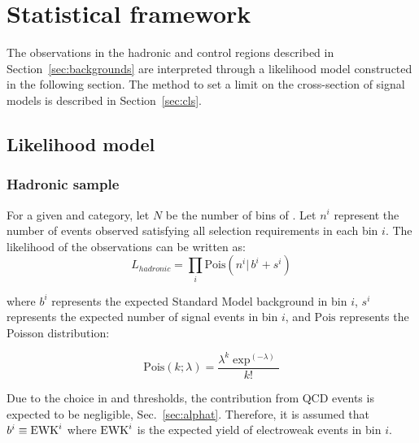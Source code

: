 \clearpage
\section{Statistical framework}
\label{sec:statistics}
The observations in the hadronic and control regions described in 
Section~\ref{sec:backgrounds} are interpreted through a likelihood model 
constructed in the following section. The method to set a limit on the 
cross-section of signal models is described in Section~\ref{sec:cls}. 

\subsection{Likelihood model\label{sec:likelihood}}

\subsubsection{Hadronic sample}
\label{sec:hadronicLikelihood}

For a given \njet and \nb category, 
let $N$ be the number of bins of \HT. Let $n^i$ represent 
the number of events observed satisfying all selection requirements 
in each \HT bin $i$.  The likelihood of the observations can be written
as:
\begin{equation}
L_{hadronic}=\prod_i \mathrm{Pois}(n^i |\, b^i + s^i)
\label{eq:hadronicLikelihood}
\end{equation}

where $b^i$ represents the expected Standard Model background in bin
$i$, $s^i$ represents the expected number of signal events in bin $i$,
and $\mathrm{Pois}$ represents the Poisson distribution:

\begin{equation}
\mathrm{Pois}\left(k;\lambda\right)= \frac{\lambda^k \exp^{\left(-\lambda\right)}}{k!}
\label{eq:poisson}
\end{equation}

Due to the choice in \alphat and \scalht thresholds, the contribution 
from QCD events is expected to be negligible, Sec.~\ref{sec:alphat}. Therefore,
it is assumed that $b^i\equiv \mathrm{EWK}^i$ where $\mathrm{EWK}^i$ is the expected 
yield of electroweak events in bin $i$.


